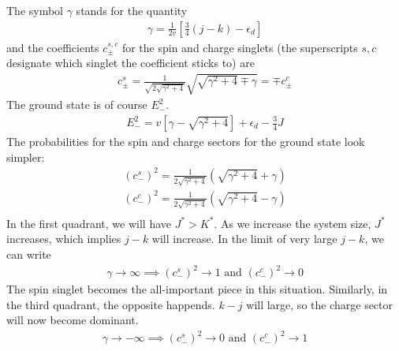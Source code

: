 \documentclass[12pt,twoside]{article}
\numberwithin{equation}{section}
\begin{document}
The symbol \(\gamma\) stands for the quantity
\begin{equation}\begin{aligned}
	\gamma = \frac{1}{2v}\left[ \frac{3}{4}\left( j - k \right) - \epsilon_d \right] 
\end{aligned}\end{equation}
and the coefficients \(c^{s,c}_\pm\) for the spin and charge singlets (the superscripts \(s,c\) designate which singlet the coefficient sticks to) are
\begin{equation}\begin{aligned}
	c^s_\pm = \frac{1}{\sqrt{2\sqrt{\gamma^2 + 4}}}\sqrt{\sqrt{\gamma^2 + 4} \mp \gamma} = \mp c^c_\pm
\end{aligned}\end{equation}
The ground state is of course \(E^2_-\).
\begin{equation}\begin{aligned}
	E^2_- = v\left[ \gamma - \sqrt{\gamma^2 + 4} \right] + \epsilon_d - \frac{3}{4}J
\end{aligned}\end{equation}
The probabilities for the spin and charge sectors for the ground state look simpler:
\begin{equation}\begin{aligned}
	\left( c^s_- \right)^2 = \frac{1}{2\sqrt{\gamma^2 + 4}}\left(\sqrt{\gamma^2 + 4} + \gamma\right)\\
	\left( c^c_- \right)^2 = \frac{1}{2\sqrt{\gamma^2 + 4}}\left(\sqrt{\gamma^2 + 4} - \gamma\right)\\
\end{aligned}\end{equation}
In the first quadrant, we will have \(J^* > K^*\). As we increase the system size, \(J^*\) increases, which implies \(j-k\) will increase. In the limit of very large \(j-k\), we can write
\begin{equation}\begin{aligned}
	\gamma \to \infty \implies \left( c^s_- \right)^2 \to 1 \text{ and } \left( c^c_- \right)^2 \to 0
\end{aligned}\end{equation}
The spin singlet becomes the all-important piece in this situation. Similarly, in the third quadrant, the opposite happends. \(k-j\) will large, so the charge sector will now become  dominant.
\begin{equation}\begin{aligned}
	\gamma \to -\infty \implies \left( c^s_- \right)^2 \to 0 \text{ and } \left( c^c_- \right)^2 \to 1
\end{aligned}\end{equation}
\end{document}
